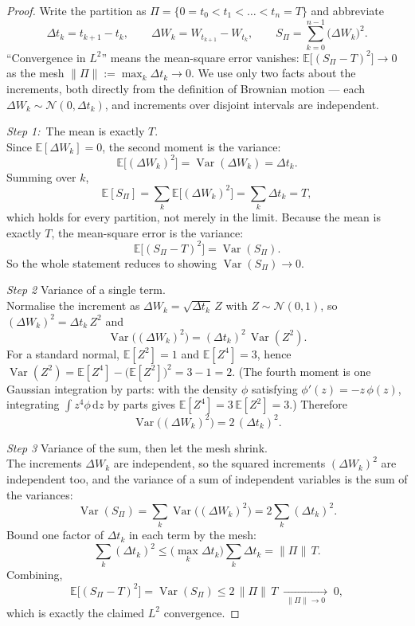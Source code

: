 \documentclass[11pt]{article}
\newcommand{\E}{\mathbb{E}}             %
\newcommand{\Var}{\operatorname{Var}}  %
\newcommand{\dd}{\mathrm{d}}           %
\theoremstyle{plain}
\theoremstyle{definition}
\theoremstyle{remark}
\begin{document}
\begin{proof}
Write the partition as $\Pi=\{0=t_0<t_1<\dots<t_n=T\}$ and abbreviate
\[
  \Delta t_k = t_{k+1}-t_k, \qquad
  \Delta W_k = W_{t_{k+1}}-W_{t_k}, \qquad
  S_\Pi = \sum_{k=0}^{n-1}\big(\Delta W_k\big)^2 .
\]
``Convergence in $L^2$'' means the mean-square error vanishes:
$\E\big[(S_\Pi-T)^2\big]\to0$ as the mesh $\|\Pi\|:=\max_k\Delta t_k\to0$.
We use only two facts about the increments, both directly from the definition
of Brownian motion --- each $\Delta W_k\sim\mathcal N(0,\Delta t_k)$, and
increments over disjoint intervals are independent.

\medskip
\noindent\emph{Step 1:}\ The mean is exactly $T$.
\\Since $\E[\Delta W_k]=0$, the second moment is the variance:
\[
  \E\big[(\Delta W_k)^2\big]=\Var(\Delta W_k)=\Delta t_k .
\]
Summing over $k$,
\[
  \E[S_\Pi]=\sum_{k}\E\big[(\Delta W_k)^2\big]
           =\sum_k \Delta t_k = T ,
\]
which holds for every partition, not merely in the limit. Because the
mean is exactly $T$, the mean-square error is the variance:
\[
  \E\big[(S_\Pi-T)^2\big]=\Var(S_\Pi) .
\]
So the whole statement reduces to showing $\Var(S_\Pi)\to0$.

\medskip
\noindent\emph{Step 2}\; Variance of a single term.
\\
Normalise the increment as $\Delta W_k=\sqrt{\Delta t_k}\,Z$ with
$Z\sim\mathcal N(0,1)$, so $(\Delta W_k)^2=\Delta t_k\,Z^2$ and
\[
  \Var\big((\Delta W_k)^2\big)=(\Delta t_k)^2\,\Var(Z^2).
\]
For a standard normal, $\E[Z^2]=1$ and $\E[Z^4]=3$, hence
$\Var(Z^2)=\E[Z^4]-\big(\E[Z^2]\big)^2=3-1=2$. (The fourth moment is one
Gaussian integration by parts: with the density $\phi$ satisfying
$\phi'(z)=-z\,\phi(z)$, integrating $\int z^4\phi\,\dd z$ by parts gives
$\E[Z^4]=3\,\E[Z^2]=3$.) Therefore
\[
  \Var\big((\Delta W_k)^2\big)=2\,(\Delta t_k)^2 .
\]

\medskip
\noindent\emph{Step 3}\; Variance of the sum, then let the mesh shrink.
\\
The increments $\Delta W_k$ are independent, so the squared increments
$(\Delta W_k)^2$ are independent too, and the variance of a sum of
independent variables is the sum of the variances:
\[
  \Var(S_\Pi)=\sum_k \Var\big((\Delta W_k)^2\big)=2\sum_k (\Delta t_k)^2 .
\]
Bound one factor of $\Delta t_k$ in each term by the mesh:
\[
  \sum_k (\Delta t_k)^2 \le \Big(\max_k \Delta t_k\Big)\sum_k \Delta t_k
                        = \|\Pi\|\,T .
\]
Combining,
\[
  \E\big[(S_\Pi-T)^2\big]=\Var(S_\Pi)\le 2\,\|\Pi\|\,T
  \;\xrightarrow[\;\|\Pi\|\to0\;]{}\;0 ,
\]
which is exactly the claimed $L^2$ convergence.
\end{proof}
\end{document}
